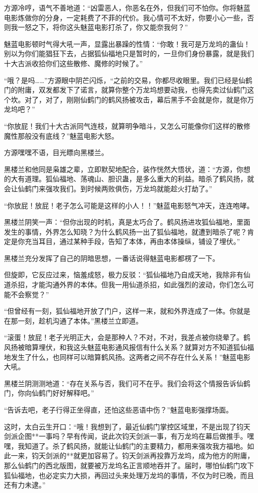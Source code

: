 \begin{this_body}
方源冷哼，语气不善地道：“凶雷恶人，你恶名在外，但我们可不怕你。你将魅蓝电影炼做你的分身，一定耗费了不菲的代价。我心情可不太好，你要小心一些，否则我一怒之下，将你这头魅蓝电影打杀了，你又能奈我何？”

魅蓝电影顿时气得大吼一声，显露出暴躁的性情：“你敢！我可是万龙坞的蛊仙！别以为你们能猖狂下去，占据狐仙福地只是暂时的，一旦你们身份暴露，就是我们十大古派收拾你们这些散修、魔修的时候了。”

“哦？是吗……”方源眼中阴芒闪烁，“之前的交易，你都尽收眼里。我们已经是仙鹤门的附庸，双发都发下了诺言，就算你整个万龙坞想要动我，也得先卖过仙鹤门这个坎。对了，对了，刚刚仙鹤门的鹤风扬被攻击，幕后黑手不会就是你，就是你万龙坞吧？”

“你放屁！我们十大古派同气连枝，就算明争暗斗，又怎么可能像你们这样的散修魔性那般没有底线？”魅蓝电影大怒。

方源嘿嘿不语，目光瞟向黑楼兰。

黑楼兰和他同是枭雄之辈，立即默契地配合，装作恍然大悟状，道：“方源，你想的大有道理。狐仙福地、荡魂山、胆识蛊，是多么重大的利益。暗杀了鹤风扬，就会让仙鹤门来强攻我们。到时候两败俱伤，万龙坞就能趁火打劫了。”

“你放屁！放屁！老子怎么可能是这样的小人！！”魅蓝电影怒气冲天，连连咆哮。

黑楼兰阴笑一声：“但你出现的时机，真是太巧合了。鹤风扬进攻狐仙福地，里面发生的事情，外界怎么知晓？为什么鹤风扬一出了狐仙福地，就遭到暗杀了呢？肯定是你充当耳目，通过某种手段，告知了本体，再由本体操纵，铺设了埋伏。”

黑楼兰充分发挥了自己的阴暗思想，一番话说得魅蓝电影都楞了一下。

但旋即，它反应过来，恼羞成怒，极力反驳：“狐仙福地乃自成天地，我除非有仙道杀招，才能沟通外界的本体。但我一用仙道杀招，如此强烈的波动，你们怎么可能不会察觉？”

“但曾经有一刻，狐仙福地开放了门户，这样一来，就和外界连成了一体。你就是在那一刻，趁机沟通了本体。”黑楼兰立即道。

“滚蛋！放屁！老子光明正大，会是那种人？不对，不对，我差点被你绕晕了。鹤风扬被暗算埋伏，和我这头魅蓝电影通风报信有什么关系？就算对方不知道狐仙福地发生了什么，也同样可以暗算鹤风扬。这两者之间不存在什么关系！”魅蓝电影大吼。

黑楼兰阴测测地道：“存在关系与否，我们可不在乎。我们会将这个情报告诉仙鹤门，你向仙鹤门好好解释吧。”

“告诉去吧，老子行得正坐得直，还怕这些恶语中伤？”魅蓝电影强撑场面。

这时，太白云生开口：“哦！我想到了，最近仙鹤门掌控区域里，不是出现了钧天剑派企图**一事吗？早有传闻，说此次钧天剑派一事，有万龙坞在幕后做推手。嘿嘿，我知道了。杀了鹤风扬，就能让仙鹤门的主要精力，都用来强攻我方福地。如此一来，钧天剑派的**就更加容易了。钧天剑派再投靠万龙坞，成为他方的附庸，那么仙鹤门的西北版图，就要被万龙坞名正言顺地吞并了。届时，哪怕仙鹤门攻下狐仙福地，也必定实力大损，再回过头来处理万龙坞的事情，不仅为时已晚，而且还有力未逮。”


\end{this_body}
